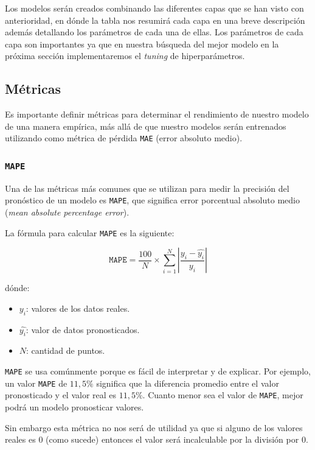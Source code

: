 \documentclass[a4paper,12pt]{article}
\begin{document}
Los modelos serán creados combinando las diferentes capas que se han visto con anterioridad, en dónde la tabla nos resumirá cada capa en una breve descripción además detallando los parámetros de cada una de ellas. Los parámetros de cada capa son importantes ya que en nuestra búsqueda del mejor modelo en la próxima sección implementaremos el \textit{tuning} de hiperparámetros.

\subsection{Métricas}

Es importante definir métricas para determinar el rendimiento de nuestro modelo de una manera empírica, más allá de que nuestro modelos serán entrenados utilizando como métrica de pérdida \texttt{MAE} (error absoluto medio).

\subsubsection{\texttt{MAPE}}

Una de las métricas más comunes que se utilizan para medir la precisión del pronóstico de un modelo es \texttt{MAPE}, que significa error porcentual absoluto medio (\textit{mean absolute percentage error}). \citep{MAPE}

La fórmula para calcular \texttt{MAPE} es la siguiente:

$$ \texttt{MAPE} = \frac{100}{N} \times \sum_{i=1}^{N} |\frac{y_i - \hat{y_i}}{y_i}| $$

dónde:

\begin{itemize}
	\item $ y_i$: valores de los datos reales.
	\item $ \hat{y_i}$: valor de datos pronosticados.
	\item $ N $: cantidad de puntos.
\end{itemize}

\texttt{MAPE} se usa comúnmente porque es fácil de interpretar y de explicar. Por ejemplo, un valor \texttt{MAPE} de $11,5\%$ significa que la diferencia promedio entre el valor pronosticado y el valor real es $11,5\%$. Cuanto menor sea el valor de \texttt{MAPE}, mejor podrá un modelo pronosticar valores.

Sin embargo esta métrica no nos será de utilidad ya que si alguno de los valores reales es $0$ (como sucede) entonces el valor será incalculable por la división por $0$. 
\end{document}
